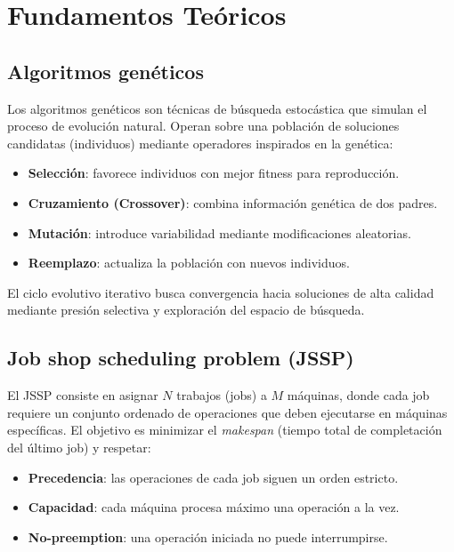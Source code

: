 \documentclass[12pt,a4paper]{article}
\begin{document}
\section{Fundamentos Teóricos}

\subsection{Algoritmos genéticos}

Los algoritmos genéticos \cite{holland1992adaptation} son técnicas de búsqueda estocástica que simulan el proceso de evolución natural. Operan sobre una población de soluciones candidatas (individuos) mediante operadores inspirados en la genética:

\begin{itemize}
    \item \textbf{Selección}: favorece individuos con mejor fitness para reproducción.
    \item \textbf{Cruzamiento (Crossover)}: combina información genética de dos padres.
    \item \textbf{Mutación}: introduce variabilidad mediante modificaciones aleatorias.
    \item \textbf{Reemplazo}: actualiza la población con nuevos individuos.
\end{itemize}

El ciclo evolutivo iterativo busca convergencia hacia soluciones de alta calidad mediante presión selectiva y exploración del espacio de búsqueda.

\subsection{Job shop scheduling problem (JSSP)}

El JSSP consiste en asignar $N$ trabajos (jobs) a $M$ máquinas, donde cada job requiere un conjunto ordenado de operaciones que deben ejecutarse en máquinas específicas. El objetivo es minimizar el \textit{makespan} (tiempo total de completación del último job) y respetar:

\begin{itemize}
    \item \textbf{Precedencia}: las operaciones de cada job siguen un orden estricto.
    \item \textbf{Capacidad}: cada máquina procesa máximo una operación a la vez.
    \item \textbf{No-preemption}: una operación iniciada no puede interrumpirse.
\end{itemize}
\end{document}
